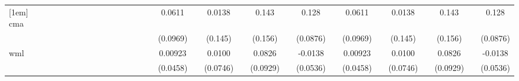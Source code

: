 \begin{table}[htbp]
\begin{tabular}{l*{28}{c}}
[1em]
cma                 &                     &                     &                     &                     &                     &                     &                     &                     &                     &                     &                     &                     &                     &      0.0611         &                     &      0.0138         &                     &       0.143         &                     &       0.128         &                     &      0.0611         &                     &      0.0138         &                     &       0.143         &                     &       0.128         \\
                    &                     &                     &                     &                     &                     &                     &                     &                     &                     &                     &                     &                     &                     &    (0.0969)         &                     &     (0.145)         &                     &     (0.156)         &                     &    (0.0876)         &                     &    (0.0969)         &                     &     (0.145)         &                     &     (0.156)         &                     &    (0.0876)         \\
[1em]
wml                 &                     &                     &                     &                     &                     &                     &                     &                     &                     &                     &                     &                     &                     &     0.00923         &                     &      0.0100         &                     &      0.0826         &                     &     -0.0138         &                     &     0.00923         &                     &      0.0100         &                     &      0.0826         &                     &     -0.0138         \\
                    &                     &                     &                     &                     &                     &                     &                     &                     &                     &                     &                     &                     &                     &    (0.0458)         &                     &    (0.0746)         &                     &    (0.0929)         &                     &    (0.0536)         &                     &    (0.0458)         &                     &    (0.0746)         &                     &    (0.0929)         &                     &    (0.0536)         \\

\end{tabular}
\end{table}
